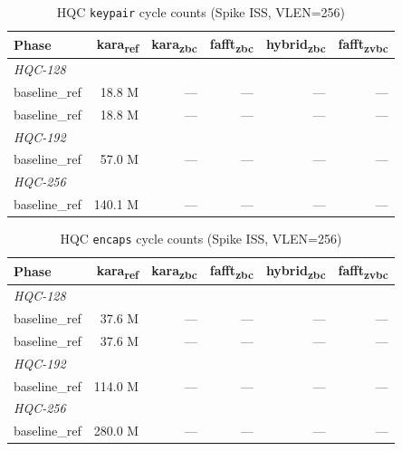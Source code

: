 
\begin{table}[h]
  \centering
  \caption{HQC \texttt{keypair} cycle counts (Spike ISS, VLEN=256)}
  \label{tab:keypair_counts}
  \begin{tabular}{lrrrrr}
    \toprule
    Phase & kara\textsubscript{ref} & kara\textsubscript{zbc} & fafft\textsubscript{zbc} & hybrid\textsubscript{zbc} & fafft\textsubscript{zvbc} \\
    \midrule
    \multicolumn{6}{l}{\textit{HQC-128}} \\
    baseline_ref & 18.8 M & — & — & — & — \\
    baseline_ref & 18.8 M & — & — & — & — \\
    \multicolumn{6}{l}{\textit{HQC-192}} \\
    baseline_ref & 57.0 M & — & — & — & — \\
    \multicolumn{6}{l}{\textit{HQC-256}} \\
    baseline_ref & 140.1 M & — & — & — & — \\
    \bottomrule
  \end{tabular}
\end{table}

\begin{table}[h]
  \centering
  \caption{HQC \texttt{encaps} cycle counts (Spike ISS, VLEN=256)}
  \label{tab:encaps_counts}
  \begin{tabular}{lrrrrr}
    \toprule
    Phase & kara\textsubscript{ref} & kara\textsubscript{zbc} & fafft\textsubscript{zbc} & hybrid\textsubscript{zbc} & fafft\textsubscript{zvbc} \\
    \midrule
    \multicolumn{6}{l}{\textit{HQC-128}} \\
    baseline_ref & 37.6 M & — & — & — & — \\
    baseline_ref & 37.6 M & — & — & — & — \\
    \multicolumn{6}{l}{\textit{HQC-192}} \\
    baseline_ref & 114.0 M & — & — & — & — \\
    \multicolumn{6}{l}{\textit{HQC-256}} \\
    baseline_ref & 280.0 M & — & — & — & — \\
    \bottomrule
  \end{tabular}
\end{table}

